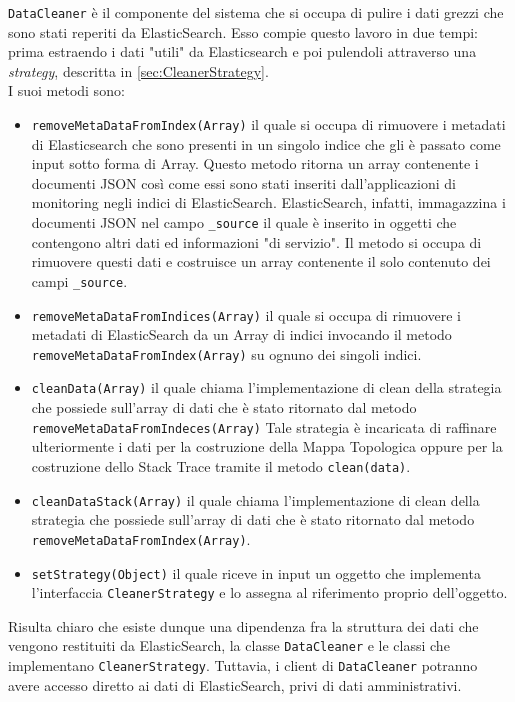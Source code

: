 \label{sec:DataCleaner}
\texttt{DataCleaner} è il componente del sistema che si occupa di pulire i dati grezzi che sono stati reperiti da ElasticSearch. Esso compie questo lavoro in due tempi: prima estraendo i dati "utili" da Elasticsearch e poi pulendoli attraverso una \emph{strategy}, descritta in \ref{sec:CleanerStrategy}.\\
I suoi metodi sono:
\begin{itemize}
	\item \texttt{removeMetaDataFromIndex(Array)} il quale si occupa di rimuovere i metadati di Elasticsearch che sono presenti in un singolo indice che gli è passato come input sotto forma di Array. Questo metodo ritorna un array contenente i documenti JSON così come essi sono stati inseriti dall'applicazioni di monitoring negli indici di ElasticSearch. ElasticSearch, infatti, immagazzina i documenti JSON nel campo \texttt{\_source} il quale è inserito in oggetti che contengono altri dati ed informazioni "di servizio". Il metodo si occupa di rimuovere questi dati e costruisce un array contenente il solo contenuto dei campi \texttt{\_source}.
	\item \texttt{removeMetaDataFromIndices(Array)} il quale si occupa di rimuovere i metadati di ElasticSearch da un Array di indici invocando il metodo \texttt{removeMetaDataFromIndex(Array)} su ognuno dei singoli indici.
	\item \texttt{cleanData(Array)} il quale chiama l'implementazione di clean della strategia che possiede sull'array di dati che è stato ritornato dal metodo \texttt{removeMetaDataFromIndeces(Array)}  Tale strategia è incaricata di raffinare ulteriormente i dati per la costruzione della Mappa Topologica oppure per la costruzione dello Stack Trace tramite il metodo \texttt{clean(data)}.
	\item \texttt{cleanDataStack(Array)} il quale chiama l'implementazione di clean della strategia che possiede sull'array di dati che è stato ritornato dal metodo \texttt{removeMetaDataFromIndex(Array)}.
	\item \texttt{setStrategy(Object)} il quale riceve in input un oggetto che implementa l'interfaccia \texttt{CleanerStrategy} e lo assegna al riferimento proprio dell'oggetto.
	
\end{itemize}
Risulta chiaro che esiste dunque una dipendenza fra la struttura dei dati che vengono restituiti da ElasticSearch, la classe \texttt{DataCleaner} e le classi che implementano \texttt{CleanerStrategy}. Tuttavia, i client di \texttt{DataCleaner} potranno avere accesso diretto ai dati di ElasticSearch, privi di dati amministrativi.

